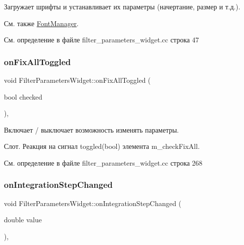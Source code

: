 Загружает шрифты и устанавливает их параметры (начертание, размер и т.\+д.). 

\begin{DoxySeeAlso}{См. также}
\hyperlink{class_font_manager}{Font\+Manager}. 
\end{DoxySeeAlso}


См. определение в файле filter\+\_\+parameters\+\_\+widget.\+cc строка 47

\hypertarget{class_filter_parameters_widget_a6d01e0b6bdb2b38f03a6935fac62a31c}{}\label{class_filter_parameters_widget_a6d01e0b6bdb2b38f03a6935fac62a31c} 
\subsubsection{\texorpdfstring{on\+Fix\+All\+Toggled}{onFixAllToggled}}
{\footnotesize\ttfamily void Filter\+Parameters\+Widget\+::on\+Fix\+All\+Toggled (\begin{DoxyParamCaption}\item[{bool}]{checked }\end{DoxyParamCaption})\hspace{0.3cm}{\ttfamily [private]}, {\ttfamily [slot]}}



Включает / выключает возможность изменять параметры. 

Слот. Реакция на сигнал toggled(bool) элемента m\+\_\+check\+Fix\+All. 

См. определение в файле filter\+\_\+parameters\+\_\+widget.\+cc строка 268

\hypertarget{class_filter_parameters_widget_a8461deaa884f5615241d6730b73f9d7b}{}\label{class_filter_parameters_widget_a8461deaa884f5615241d6730b73f9d7b} 
\subsubsection{\texorpdfstring{on\+Integration\+Step\+Changed}{onIntegrationStepChanged}}
{\footnotesize\ttfamily void Filter\+Parameters\+Widget\+::on\+Integration\+Step\+Changed (\begin{DoxyParamCaption}\item[{double}]{value }\end{DoxyParamCaption})\hspace{0.3cm}{\ttfamily [private]}, {\ttfamily [slot]}}




